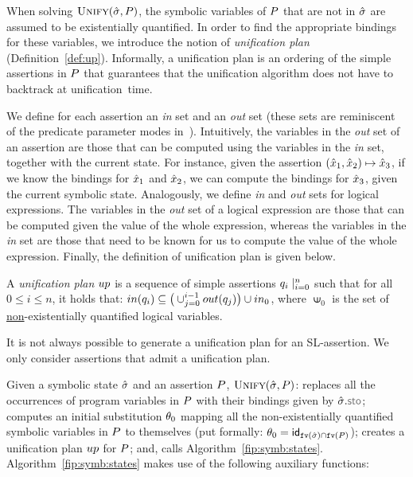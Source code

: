 When solving $\textsc{Unify}(\hat{\sigma}, P)$, the symbolic variables of $P$ that are not 
in $\hat{\sigma}$ are assumed to be existentially quantified. 
In order to find the appropriate bindings for these variables, we 
introduce the notion of \emph{unification plan} (Definition~\ref{def:up}).
Informally, a unification plan is an ordering of the simple assertions in $P$ that 
guarantees that the unification algorithm does not have to backtrack at unification~time. 

We define for each assertion an \emph{in} set and an \emph{out} set (these 
sets are reminiscent of the predicate parameter modes in~\cite{nguyen:vmcai:2008}).
Intuitively, the variables in the \emph{out} set of an assertion are those that can be computed 
using the variables in the \emph{in} set, together with the current state. 
For instance, given the assertion $(\hat{x}_1, \hat{x}_2) \mapsto \hat{x}_3$, if we know the bindings
for $\hat{x}_1$ and $\hat{x}_2$, we can compute the bindings for $\hat{x}_3$, given 
the current symbolic state. 
%
Analogously, we define \emph{in} and \emph{out} sets for logical expressions. 
The variables in the \emph{out} set of a logical expression are those that can be computed
given the value of the whole expression, whereas the variables in the \emph{in} set 
are those that need to be known for us to compute the value of the whole expression.  
Finally, the definition of unification plan is given below. 

\begin{definition}\label{def:up}
A \emph{unification plan} $up$ is a sequence of simple assertions $q_i \mid_{i=0}^n$ such that
for all $0 \leq i \leq n$, it holds that:
$
 in(q_i) \subseteq \big(\cup_{j = 0}^{i-1} out(q_j)\big) \cup in_0
$,
where $\upin_0$ is the set of \underline{non}-existentially quantified logical variables. 
\end{definition}

\vspace{-3pt}
\noindent It is not always possible to generate a unification plan for an SL-assertion. We only 
consider assertions that admit a unification plan. 


Given a symbolic state $\hat{\sigma}$ and an assertion $P$, $\textsc{Unify}(\hat{\sigma}, P)$: 
 replaces all the occurrences of program variables in $P$ with their bindings 
given by $\sstate.\stosel$;
 computes an initial substitution $\theta_0$ mapping all the non-existentially quantified symbolic 
variables in $P$ to themselves (put formally: $\theta_0 = {\sf id}_{\texttt{fv}(\hat{\sigma}) \cap \texttt{fv}(P)}$); 
 creates a unification plan $up$ for $P$; and, 
 calls Algorithm~\ref{fip:symb:states}. 
%
Algorithm~\ref{fip:symb:states} makes use of the following auxiliary functions: 

